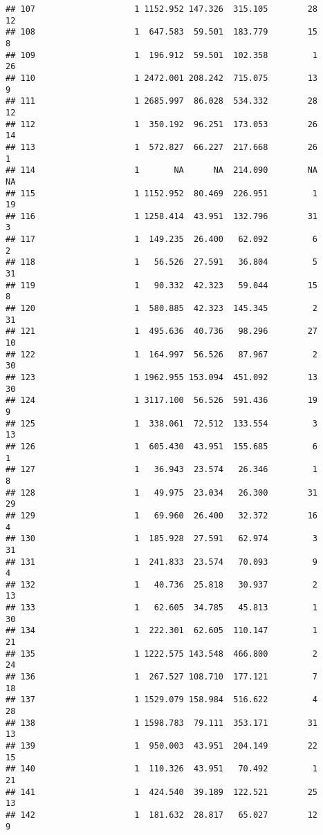 \documentclass[
]{article}
\begin{document}
\begin{verbatim}
## 107                    1 1152.952 147.326  315.105        28        12
## 108                    1  647.583  59.501  183.779        15         8
## 109                    1  196.912  59.501  102.358         1        26
## 110                    1 2472.001 208.242  715.075        13         9
## 111                    1 2685.997  86.028  534.332        28        12
## 112                    1  350.192  96.251  173.053        26        14
## 113                    1  572.827  66.227  217.668        26         1
## 114                    1       NA      NA  214.090        NA        NA
## 115                    1 1152.952  80.469  226.951         1        19
## 116                    1 1258.414  43.951  132.796        31         3
## 117                    1  149.235  26.400   62.092         6         2
## 118                    1   56.526  27.591   36.804         5        31
## 119                    1   90.332  42.323   59.044        15         8
## 120                    1  580.885  42.323  145.345         2        31
## 121                    1  495.636  40.736   98.296        27        10
## 122                    1  164.997  56.526   87.967         2        30
## 123                    1 1962.955 153.094  451.092        13        30
## 124                    1 3117.100  56.526  591.436        19         9
## 125                    1  338.061  72.512  133.554         3        13
## 126                    1  605.430  43.951  155.685         6         1
## 127                    1   36.943  23.574   26.346         1         8
## 128                    1   49.975  23.034   26.300        31        29
## 129                    1   69.960  26.400   32.372        16         4
## 130                    1  185.928  27.591   62.974         3        31
## 131                    1  241.833  23.574   70.093         9         4
## 132                    1   40.736  25.818   30.937         2        13
## 133                    1   62.605  34.785   45.813         1        30
## 134                    1  222.301  62.605  110.147         1        21
## 135                    1 1222.575 143.548  466.800         2        24
## 136                    1  267.527 108.710  177.121         7        18
## 137                    1 1529.079 158.984  516.622         4        28
## 138                    1 1598.783  79.111  353.171        31        13
## 139                    1  950.003  43.951  204.149        22        15
## 140                    1  110.326  43.951   70.492         1        21
## 141                    1  424.540  39.189  122.521        25        13
## 142                    1  181.632  28.817   65.027        12         9

\end{verbatim}
\end{document}
